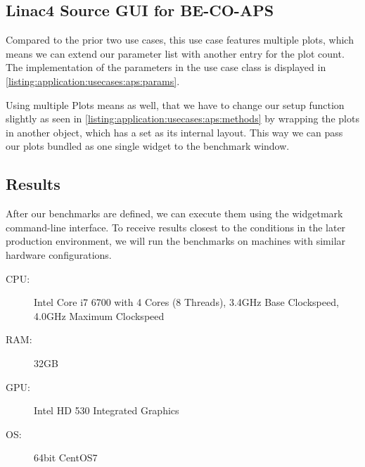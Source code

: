 

\subsection{Linac4 Source GUI for BE-CO-APS}

Compared to the prior two use cases, this use case features multiple plots,
which means we can extend our parameter list with another entry for the plot
count. The implementation of the parameters in the use case class is displayed
in \ref{listing:application:usecases:aps:params}.



Using multiple Plots means as well, that we have to change our setup function
slightly as seen in \ref{listing:application:usecases:aps:methods} by wrapping
the plots in another  object, which has a
 set as its internal layout. This way
we can pass our plots bundled as one single widget to the benchmark window.



\subsection{Results}

After our benchmarks are defined, we can execute them using the widgetmark
command-line interface. To receive results closest to the conditions in the
later production environment, we will run the benchmarks on machines with
similar hardware configurations.

\begin{description}

    \item[CPU:] Intel Core i7 6700 with 4 Cores (8 Threads),
                3.4GHz Base Clockspeed,
                4.0GHz Maximum Clockspeed

    \item[RAM:] 32GB

    \item[GPU:] Intel HD 530 Integrated Graphics

    \item[OS:] 64bit CentOS7

\end{description}

